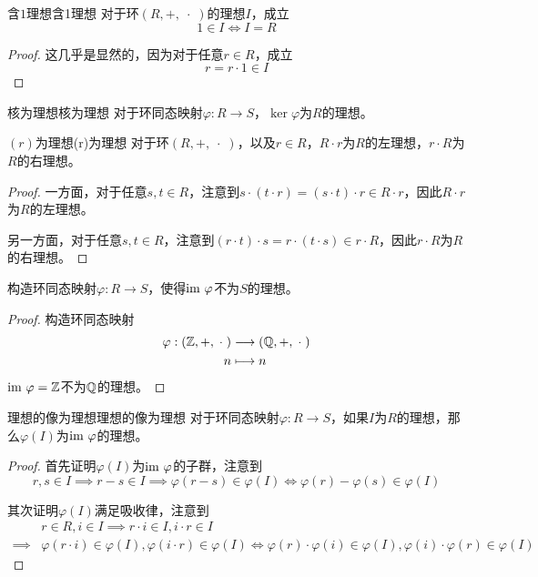 \begin{proposition}{含$1$理想}{含1理想}
	对于环$(R,+,\;\cdot\;)$的理想$I$，成立
	$$
	1\in I\iff I=R
	$$
\end{proposition}

\begin{proof}
	这几乎是显然的，因为对于任意$r\in R$，成立
	$$
	r=r\cdot 1\in I
	$$
\end{proof}

\begin{proposition}{核为理想}{核为理想}
	对于环同态映射$\varphi:R\to S$，$\ker\varphi$为$R$的理想。
\end{proposition}

\begin{proposition}{$(r)$为理想}{(r)为理想}
	对于环$(R,+,\;\cdot\;)$，以及$r\in R$，$R\cdot r$为$R$的左理想，$r\cdot R$为$R$的右理想。
\end{proposition}

\begin{proof}
	一方面，对于任意$s,t\in R$，注意到$s\cdot (t\cdot r)=(s\cdot t)\cdot r\in R\cdot r$，因此$R\cdot r$为$R$的左理想。
	
	另一方面，对于任意$s,t\in R$，注意到$(r\cdot t)\cdot s=r\cdot (t\cdot s)\in r\cdot R$，因此$r\cdot R$为$R$的右理想。
\end{proof}

\begin{example}
	构造环同态映射$\varphi:R\to S$，使得$\text{im } \varphi$不为$S$的理想。
\end{example}

\begin{proof}
	构造环同态映射
	\begin{align*}
		\varphi:\begin{aligned}[t]
			(\mathbb{Z},+,\;\cdot\;)&\longrightarrow(\mathbb{Q},+,\;\cdot\;)\\
			n&\longmapsto n
		\end{aligned}
	\end{align*}
	$\text{im } \varphi=\mathbb{Z}$不为$\mathbb{Q}$的理想。
\end{proof}

\begin{proposition}{理想的像为理想}{理想的像为理想}
	对于环同态映射$\varphi:R\to S$，如果$I$为$R$的理想，那么$\varphi(I)$为$\text{im } \varphi$的理想。
\end{proposition}

\begin{proof}
	首先证明$\varphi(I)$为$\text{im } \varphi$的子群，注意到
	$$
	r,s\in I
	\implies r-s\in I
	\implies \varphi(r-s)\in\varphi(I)
	\iff \varphi(r)-\varphi(s)\in\varphi(I)
	$$
	
	其次证明$\varphi(I)$满足吸收律，注意到
	\begin{align*}
		&r\in R,i\in I
		\implies r\cdot i\in I,i\cdot r\in I\\
		\implies &\varphi(r\cdot i)\in\varphi(I),\varphi(i\cdot r)\in\varphi(I)
		\iff \varphi(r)\cdot \varphi(i)\in\varphi(I),\varphi(i)\cdot \varphi(r)\in\varphi(I)
	\end{align*}
\end{proof}

